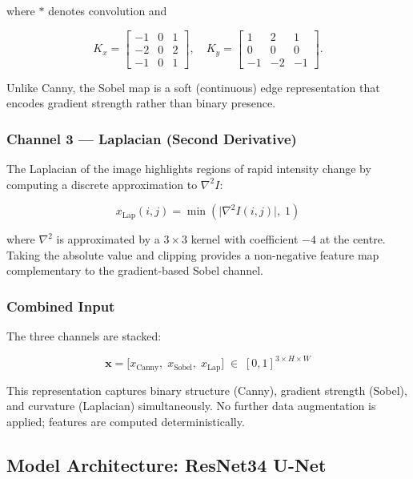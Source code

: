 \documentclass[10pt,twocolumn]{article}
\begin{document}
where $*$ denotes convolution and

\[
  K_x = \begin{bmatrix} -1 & 0 & 1 \\ -2 & 0 & 2 \\ -1 & 0 & 1 \end{bmatrix},
  \quad
  K_y = \begin{bmatrix} 1 & 2 & 1 \\ 0 & 0 & 0 \\ -1 & -2 & -1 \end{bmatrix}.
\]

Unlike Canny, the Sobel map is a soft (continuous) edge representation that
encodes gradient strength rather than binary presence.

\subsubsection*{Channel 3 --- Laplacian (Second Derivative)}

The Laplacian of the image highlights regions of rapid intensity change by
computing a discrete approximation to $\nabla^2 I$:

\begin{equation}
  x_{\text{Lap}}(i,j) = \min\!\left(\bigl|\nabla^2 I(i,j)\bigr|,\; 1\right)
  \label{eq:laplacian}
\end{equation}

where $\nabla^2$ is approximated by a $3\times3$ kernel with coefficient
$-4$ at the centre.
Taking the absolute value and clipping provides a non-negative feature map
complementary to the gradient-based Sobel channel.

\subsubsection*{Combined Input}

The three channels are stacked:

\begin{equation}
  \mathbf{x} = \bigl[x_{\text{Canny}},\; x_{\text{Sobel}},\; x_{\text{Lap}}\bigr]
  \;\in\; [0,1]^{3\times H\times W}
  \label{eq:input}
\end{equation}

This representation captures binary structure (Canny), gradient strength
(Sobel), and curvature (Laplacian) simultaneously.
No further data augmentation is applied; features are computed deterministically.

\subsection{Model Architecture: ResNet34 U-Net}
\label{sec:model}
\end{document}
